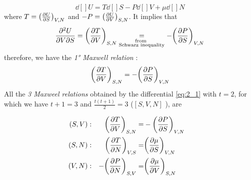 \documentclass[../main/main.tex]{subfiles}
\begin{document}
\begin{example}
\begin{equation}
  \dd[]{U} = T \dd[]{S} - P \dd[]{V} + \mu \dd[]{N}
  \label{eq:2_1}
\end{equation}
where \( T = \qty(\pdv{U}{S} )_{V,N}  \) and  \( -P = \qty(\pdv{U}{V} )_{S,N}  \). It implies that
\begin{equation*}
        \pdv{U}{V}{S} = \qty(\pdv{T}{V} )_{S,N} \underset{\substack{ \text{from } \\  \text{Schwarz inequality} } }{=} -\qty(\pdv{P}{S} )_{V,N}
\end{equation*}
therefore, we have the \emph{1° Maxwell relation} :
\begin{equation*}
  \qty(\pdv{T}{V} )_{S,N} = -\qty(\pdv{P}{S} )_{V,N}
\end{equation*}
All the \emph{3 Maxweel relations} obtained by the differential \eqref{eq:2_1}
with \( t=2 \), for which we have \( t+1=3 \) and \( \frac{t(t+1)}{2}=3 \) (\( [S,V,N] \) ), are

\begin{subequations}
\begin{align}
  (S,V) &:& \qty(\pdv{T}{V} )_{S,N} =& - \qty(\pdv{P}{S} )_{V,N} & \\
  (S,N) &:& \qty(\pdv{T}{N} )_{V,S} =& \qty(\pdv{\mu }{S} )_{V,N} &\\
  (V,N) &:& -\qty(\pdv{P}{N} )_{S,V} =& \qty(\pdv{\mu }{V} )_{S,N} &
 \end{align}
\label{}
\end{subequations}
\end{example}
\end{document}
